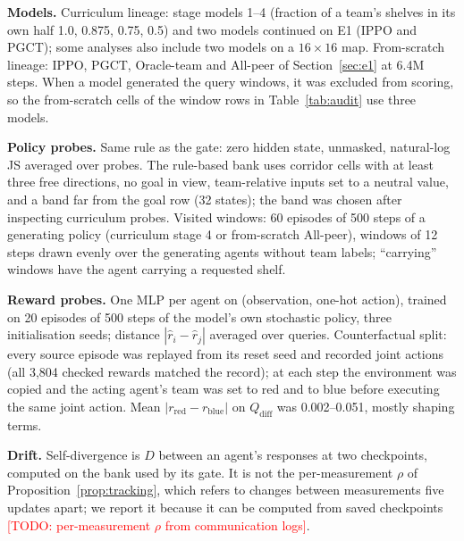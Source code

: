 \documentclass{article}
\theoremstyle{remark}
\newcommand{\todo}[1]{\textcolor{red}{[TODO: #1]}}
\newcommand{\ours}{PGCT}
\begin{document}
\textbf{Models.} Curriculum lineage: stage models 1--4 (fraction of a team's shelves in its own half 1.0, 0.875, 0.75, 0.5) and two models
continued on E1 (IPPO and \ours{}); some analyses also include two models on a $16\times16$ map. From-scratch lineage: IPPO, \ours{},
Oracle-team and All-peer of Section~\ref{sec:e1} at 6.4M steps. When a model generated the query windows, it was excluded from scoring, so
the from-scratch cells of the window rows in Table~\ref{tab:audit} use three models.

\textbf{Policy probes.} Same rule as the gate: zero hidden state, unmasked, natural-log JS averaged over probes. The rule-based bank uses
corridor cells with at least three free directions, no goal in view, team-relative inputs set to a neutral value, and a band far from the
goal row (32 states); the band was chosen after inspecting curriculum probes. Visited windows: 60 episodes of 500 steps of a generating
policy (curriculum stage 4 or from-scratch All-peer), windows of 12 steps drawn evenly over the generating agents without team labels;
``carrying'' windows have the agent carrying a requested shelf.

\textbf{Reward probes.} One MLP per agent on (observation, one-hot action), trained on 20 episodes of 500 steps of the model's own
stochastic policy, three initialisation seeds; distance $|\hat r_i-\hat r_j|$ averaged over queries. Counterfactual split: every source
episode was replayed from its reset seed and recorded joint actions (all 3{,}804 checked rewards matched the record); at each step the
environment was copied and the acting agent's team was set to red and to blue before executing the same joint action. Mean
$|r_{\mathrm{red}}-r_{\mathrm{blue}}|$ on $Q_{\mathrm{diff}}$ was 0.002--0.051, mostly shaping terms.

\textbf{Drift.} Self-divergence is $D$ between an agent's responses at two checkpoints, computed on the bank used by its gate. It is not the
per-measurement $\rho$ of Proposition~\ref{prop:tracking}, which refers to changes between measurements five updates apart; we report it
because it can be computed from saved checkpoints \todo{per-measurement $\rho$ from communication logs}.
\end{document}
